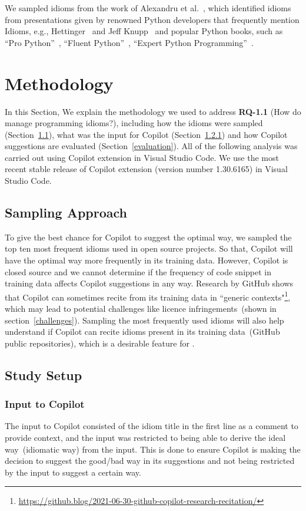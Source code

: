 We sampled idioms from the work of Alexandru et al.~\cite{Alexandru2018}, which identified idioms from presentations given by renowned Python developers that frequently mention Idioms, e.g., Hettinger~\cite{hettinger} and Jeff Knupp~\cite{knupp} and popular Python books, such as ``Pro Python''~\cite{Alchin2010}, ``Fluent Python''~\cite{fluent}, ``Expert Python Programming''~\cite{expert}.

\section{Methodology}
\label{methodology}
In this Section, We explain the methodology we used to address \textbf{RQ-1.1} (How do \cct{} manage programming idioms?), including how the idioms were sampled (Section~\ref{sampling}), what was the input for Copilot (Section~\ref{input}) and how Copilot suggestions are evaluated (Section~\ref{evaluation}). All of the following analysis was carried out using Copilot extension in Visual Studio Code. We use the most recent stable release of Copilot extension (version number 1.30.6165) in Visual Studio Code.

\subsection{Sampling Approach}
\label{sampling}
To give the best chance for Copilot to suggest the optimal way, we sampled the top ten most frequent idioms used in open source projects. So that, Copilot will have the optimal way more frequently in its training data. However, Copilot is closed source and we cannot determine if the frequency of code snippet in training data affects Copilot suggestions in any way. Research by GitHub shows that Copilot can sometimes recite from its training data in ``generic contexts"\footnote{\url{https://github.blog/2021-06-30-github-copilot-research-recitation/}}, which may lead to potential challenges like licence infringements~(shown in section~\ref{challenges}). Sampling the most frequently used idioms will also help understand if Copilot can recite idioms present in its training data~(GitHub public repositories), which is a desirable feature for \cct{}.

\subsection{Study Setup}

\subsubsection{Input to Copilot}
\label{input}
The input to Copilot consisted of the idiom title in the first line as a comment to provide context, and the input was restricted to being able to derive the ideal way~(idiomatic way) from the input. This is done to ensure Copilot is making the decision to suggest the good/bad way in its suggestions and not being restricted by the input to suggest a certain way. 

